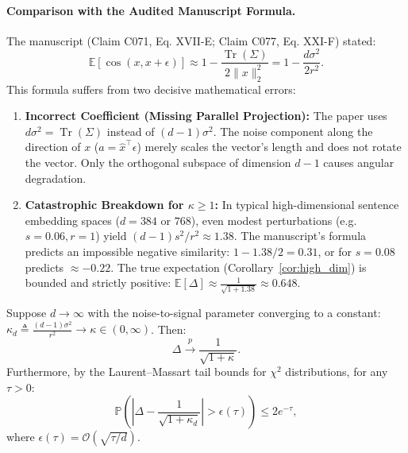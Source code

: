 \paragraph{Comparison with the Audited Manuscript Formula.}
The manuscript (Claim C071, Eq. XVII-E; Claim C077, Eq. XXI-F) stated:
\begin{equation}
\mathbb{E}[\cos(x, x+\epsilon)] \approx 1 - \frac{\operatorname{Tr}(\Sigma)}{2\|x\|_2^2} = 1 - \frac{d\sigma^2}{2r^2}.
\end{equation}
This formula suffers from two decisive mathematical errors:
\begin{enumerate}
    \item \textbf{Incorrect Coefficient (Missing Parallel Projection):} The paper uses $d\sigma^2 = \operatorname{Tr}(\Sigma)$ instead of $(d-1)\sigma^2$. The noise component along the direction of $x$ ($a = \hat{x}^\top \epsilon$) merely scales the vector's length and does not rotate the vector. Only the orthogonal subspace of dimension $d-1$ causes angular degradation.
    \item \textbf{Catastrophic Breakdown for $\kappa \ge 1$:} In typical high-dimensional sentence embedding spaces ($d = 384$ or $768$), even modest perturbations (e.g. $s = 0.06, r = 1$) yield $(d-1)s^2/r^2 \approx 1.38$. The manuscript's formula predicts an impossible negative similarity: $1 - 1.38/2 = 0.31$, or for $s = 0.08$ predicts $\approx -0.22$. The true expectation (Corollary~\ref{cor:high_dim}) is bounded and strictly positive: $\mathbb{E}[\Delta] \approx \frac{1}{\sqrt{1 + 1.38}} \approx 0.648$.
\end{enumerate}

\begin{corollary}
\label{cor:high_dim}
Suppose $d \to \infty$ with the noise-to-signal parameter converging to a constant: $\kappa_d \triangleq \frac{(d-1)\sigma^2}{r^2} \to \kappa \in (0, \infty)$. Then:
\begin{equation}
\Delta \xrightarrow{p} \frac{1}{\sqrt{1 + \kappa}}.
\end{equation}
Furthermore, by the Laurent--Massart tail bounds for $\chi^2$ distributions, for any $\tau > 0$:
\begin{equation}
\mathbb{P}\left( \left| \Delta - \frac{1}{\sqrt{1 + \kappa_d}} \right| > \epsilon(\tau) \right) \le 2e^{-\tau},
\end{equation}
where $\epsilon(\tau) = \mathcal{O}(\sqrt{\tau / d})$.
\end{corollary}

